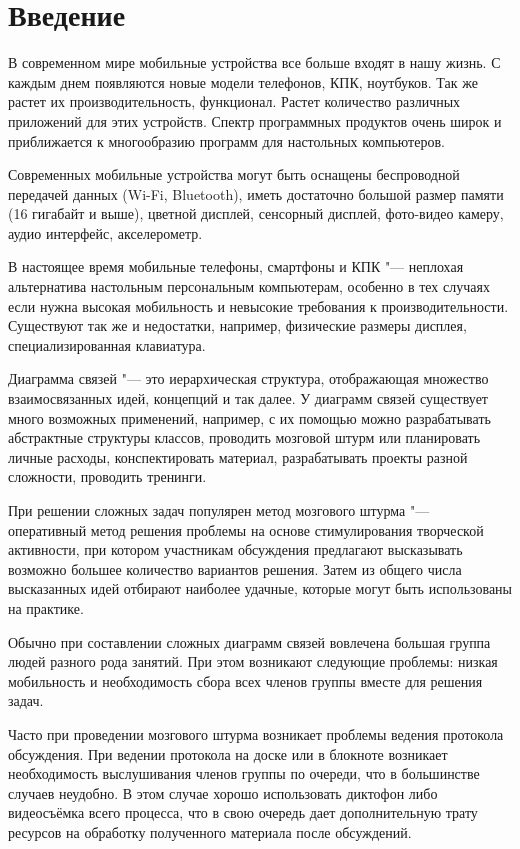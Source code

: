 \newpage

\chapter*{Введение}\label{chap:introduction}

В современном мире мобильные устройства все больше входят в нашу жизнь. С каждым днем появляются новые модели телефонов, КПК, ноутбуков. Так же растет их производительность, функционал. Растет количество различных приложений для этих устройств. Спектр программных продуктов очень широк и приближается к многообразию программ для настольных компьютеров.

Современных мобильные устройства могут быть оснащены беспроводной передачей данных (Wi-Fi, Bluetooth), иметь достаточно большой размер памяти (16 гигабайт и выше), цветной дисплей, сенсорный дисплей, фото-видео камеру, аудио интерфейс, акселерометр.

В настоящее время мобильные телефоны, смартфоны и КПК "--- неплохая альтернатива настольным персональным компьютерам, особенно в тех случаях если нужна высокая мобильность и невысокие требования к производительности. Существуют так же и недостатки, например, физические размеры дисплея, специализированная клавиатура.

Диаграмма связей "--- это иерархическая структура, отображающая множество взаимосвязанных идей, концепций и так далее. У диаграмм связей существует много возможных применений, например, с их помощью можно разрабатывать абстрактные структуры классов, проводить мозговой штурм или планировать личные расходы, конспектировать материал, разрабатывать проекты разной сложности, проводить тренинги.

При решении сложных задач популярен метод мозгового штурма "--- оперативный метод решения проблемы на основе стимулирования творческой активности, при котором участникам обсуждения предлагают высказывать возможно большее количество вариантов решения. Затем из общего числа высказанных идей отбирают наиболее удачные, которые могут быть использованы на практике.

Обычно при составлении сложных диаграмм связей вовлечена большая группа людей разного рода занятий. При этом возникают следующие проблемы: низкая мобильность и необходимость сбора всех членов группы вместе для решения задач.

Часто при проведении мозгового штурма возникает проблемы ведения протокола обсуждения. При ведении протокола на доске или в блокноте возникает необходимость выслушивания членов группы по очереди, что в большинстве случаев неудобно. В этом случае хорошо использовать диктофон либо видеосъёмка всего процесса, что в свою очередь дает дополнительную трату ресурсов на обработку полученного материала после обсуждений.

